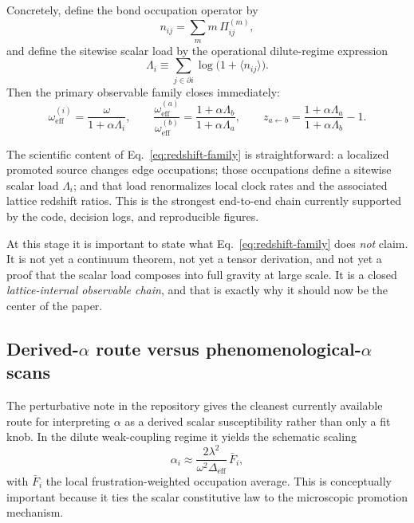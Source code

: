 \documentclass[11pt]{article}
\begin{document}
Concretely, define the bond occupation operator by
\begin{equation}
n_{ij} = \sum_m m\,\Pi_{ij}^{(m)},
\label{eq:bond-occupation}
\end{equation}
and define the sitewise scalar load by the operational dilute-regime expression
\begin{equation}
\Lambda_i
\equiv
\sum_{j\in \partial i}\log\!\bigl(1+\langle n_{ij}\rangle\bigr).
\label{eq:lambda-operational}
\end{equation}
Then the primary observable family closes immediately:
\begin{equation}
\omega_{\mathrm{eff}}^{(i)}
=
\frac{\omega}{1+\alpha \Lambda_i},
\qquad
\frac{\omega_{\mathrm{eff}}^{(a)}}{\omega_{\mathrm{eff}}^{(b)}}
=
\frac{1+\alpha\Lambda_b}{1+\alpha\Lambda_a},
\qquad
z_{a\leftarrow b}
=
\frac{1+\alpha\Lambda_a}{1+\alpha\Lambda_b}-1.
\label{eq:redshift-family}
\end{equation}

The scientific content of Eq.~\eqref{eq:redshift-family} is straightforward: a localized promoted source changes edge occupations; those occupations define a sitewise scalar load $\Lambda_i$; and that load renormalizes local clock rates and the associated lattice redshift ratios. This is the strongest end-to-end chain currently supported by the code, decision logs, and reproducible figures.

At this stage it is important to state what Eq.~\eqref{eq:redshift-family} does \emph{not} claim. It is not yet a continuum theorem, not yet a tensor derivation, and not yet a proof that the scalar load composes into full gravity at large scale. It is a closed \emph{lattice-internal observable chain}, and that is exactly why it should now be the center of the paper.

\subsection{Derived-\texorpdfstring{$\alpha$}{alpha} route versus phenomenological-\texorpdfstring{$\alpha$}{alpha} scans}

The perturbative note in the repository gives the cleanest currently available route for interpreting $\alpha$ as a derived scalar susceptibility rather than only a fit knob. In the dilute weak-coupling regime it yields the schematic scaling
\begin{equation}
\alpha_i
\approx
\frac{2\lambda^2}{\omega^2\Delta_{\mathrm{eff}}}\,\bar F_i,
\label{eq:alpha-pert}
\end{equation}
with $\bar F_i$ the local frustration-weighted occupation average. This is conceptually important because it ties the scalar constitutive law to the microscopic promotion mechanism.
\end{document}
